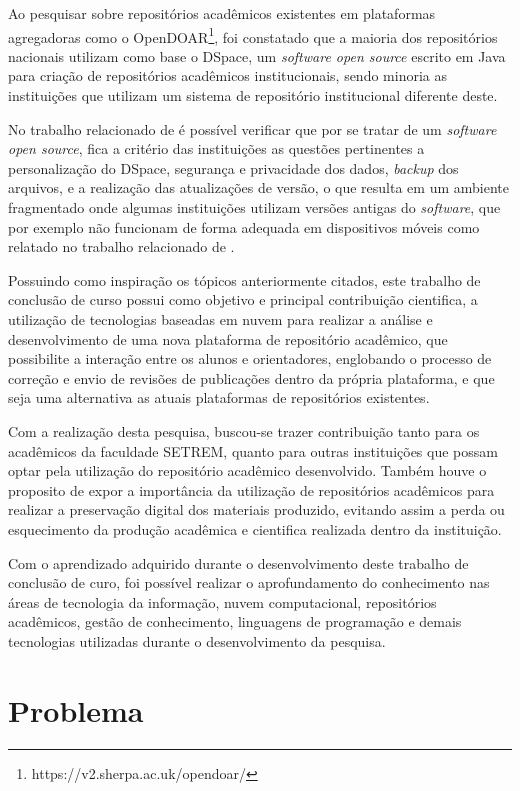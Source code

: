 Ao pesquisar sobre repositórios acadêmicos existentes em plataformas
agregadoras como o OpenDOAR\footnote{https://v2.sherpa.ac.uk/opendoar/},
foi constatado que a maioria dos repositórios nacionais utilizam como
base o DSpace, um \emph{software open source} escrito em Java para
criação de repositórios acadêmicos institucionais,
sendo minoria as instituições que utilizam um sistema de repositório
institucional diferente deste.

No trabalho relacionado de \cite{GarciaRodrigoMoreira2019DdnB} é possível
verificar que por se tratar de um \emph{software open source},
fica a critério das instituições as questões pertinentes a personalização
do DSpace, segurança e privacidade dos dados, \emph{backup} dos arquivos,
e a realização das atualizações de versão, o que resulta em um ambiente
fragmentado onde algumas instituições utilizam versões antigas do \emph{software},
que por exemplo não funcionam de forma adequada em dispositivos móveis como
relatado no trabalho relacionado de \cite{FernandesMacedes:2019}.

Possuindo como inspiração os tópicos anteriormente citados,
este trabalho de conclusão de curso possui como objetivo e principal
contribuição cientifica, a utilização de tecnologias baseadas em
nuvem para realizar a análise e desenvolvimento de uma nova plataforma
de repositório acadêmico, que possibilite a interação entre os alunos
e orientadores, englobando o processo de correção e envio de revisões
de publicações dentro da própria plataforma, e que seja uma alternativa
as atuais plataformas de repositórios existentes.

Com a realização desta pesquisa, buscou-se trazer contribuição
tanto para os acadêmicos da faculdade SETREM, quanto para outras
instituições que possam optar pela utilização do repositório
acadêmico desenvolvido. Também houve o proposito de expor a
importância da utilização de repositórios acadêmicos para realizar
a preservação digital dos materiais produzido, evitando assim a perda
ou esquecimento da produção acadêmica e cientifica realizada dentro
da instituição.

Com o aprendizado adquirido durante o desenvolvimento deste trabalho
de conclusão de curo, foi possível realizar o aprofundamento do
conhecimento nas áreas de tecnologia da informação, nuvem computacional,
repositórios acadêmicos, gestão de conhecimento, linguagens de programação
e demais tecnologias utilizadas durante o desenvolvimento da pesquisa.

\section{Problema} \label{sec::Problem}

